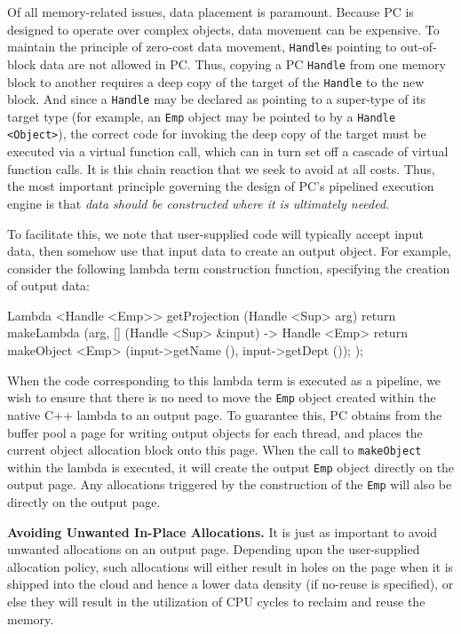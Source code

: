 Of all memory-related issues,  
data placement is paramount.  Because PC is designed to operate over
complex objects, data movement can be 
expensive.  To maintain the principle of
zero-cost data movement, \texttt{Handle}s pointing to out-of-block data are not allowed in PC.
Thus, copying a PC \texttt{Handle} from one memory block to another requires a deep copy of the target of the \texttt{Handle} to the new block.  
And since a
\texttt{Handle} may be declared as pointing to a super-type of its
target type (for example, an \texttt{Emp} object may be pointed to by a \texttt{Handle <Object>}), the correct code for invoking the deep copy of the
target must be executed via a virtual 
function call, which can in turn set off a cascade of virtual function calls. It is this chain reaction that we seek to avoid at all costs.
Thus, the most important principle governing the 
design of PC's pipelined execution engine is that \emph{data should be constructed where it is ultimately needed}.

To facilitate this, we note that user-supplied code will typically accept input data, then somehow use that input data to
create an output object.  For example, consider 
the following lambda term construction function, specifying the creation of output data:

\begin{codesmall}
Lambda <Handle <Emp>> getProjection (Handle <Sup> arg) {
        return makeLambda (arg, [] (Handle <Sup> &input) -> Handle <Emp> {
		return makeObject <Emp> (input->getName (), input->getDept ());
	});}
\end{codesmall}

\noindent
When the code corresponding to this lambda term is executed as a pipeline,
we wish to ensure that there is no need to move the \texttt{Emp} object created within the native C++ lambda to an output page.
To guarantee this,
PC obtains from the buffer pool a page for writing output objects for each thread, and places the current object allocation block
onto this page. 
When the call to \texttt{makeObject} within the lambda is executed, it will create the output \texttt{Emp} object
directly on the output page.  Any allocations triggered by the construction of the \texttt{Emp} will also be directly on the output page.

\vspace{5 pt}
\noindent
\textbf{Avoiding Unwanted In-Place Allocations.}
It is just as important to avoid unwanted allocations on an output page.  Depending upon the user-supplied
allocation policy, such allocations will either result
in holes on the page when it is shipped into the cloud and hence a lower data density (if no-reuse is specified), 
or else they will result in the utilization of CPU cycles to 
reclaim and reuse the memory. 

